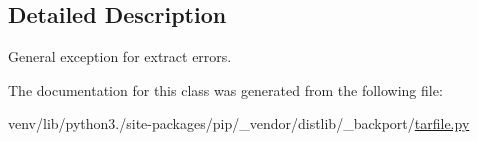 \subsection{Detailed Description}
\begin{DoxyVerb}General exception for extract errors.\end{DoxyVerb}
 

The documentation for this class was generated from the following file\+:\begin{DoxyCompactItemize}
\item 
venv/lib/python3./site-\/packages/pip/\+\_\+vendor/distlib/\+\_\+backport/\hyperlink{tarfile_8py}{tarfile.\+py}\end{DoxyCompactItemize}

